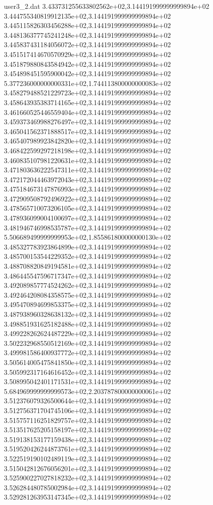 \begin{filecontents}{user3_2.dat}
3.433731255633802562e+02,3.144191999999999894e+02
3.444755340819912135e+02,3.144191999999999894e+02
3.445115826303456288e+02,3.144191999999999894e+02
3.448136377745241248e+02,3.144191999999999894e+02
3.445837431184056072e+02,3.144191999999999894e+02
3.451517414670570929e+02,3.144191999999999894e+02
3.451879880843584942e+02,3.144191999999999894e+02
3.454898451595900042e+02,3.144191999999999894e+02
5.377236000000000331e+02,1.744113800000000083e+02
3.458279488521229723e+02,3.144191999999999894e+02
3.458643935383714165e+02,3.144191999999999894e+02
3.461660525446559404e+02,3.144191999999999894e+02
3.459373469988276497e+02,3.144191999999999894e+02
3.465041562371888517e+02,3.144191999999999894e+02
3.465407989923842820e+02,3.144191999999999894e+02
3.468422599297218198e+02,3.144191999999999894e+02
3.460835107981220631e+02,3.144191999999999894e+02
3.471803636222547311e+02,3.144191999999999894e+02
3.472172044463972043e+02,3.144191999999999894e+02
3.475184673147876993e+02,3.144191999999999894e+02
3.472909508792496922e+02,3.144191999999999894e+02
3.478565710073206105e+02,3.144191999999999894e+02
3.478936099004100697e+02,3.144191999999999894e+02
3.481946746998535787e+02,3.144191999999999894e+02
5.506689499999999953e+02,1.855861800000000130e+02
3.485327783923864899e+02,3.144191999999999894e+02
3.485700153544229352e+02,3.144191999999999894e+02
3.488708820849194581e+02,3.144191999999999894e+02
3.486445547596717347e+02,3.144191999999999894e+02
3.492089857774524262e+02,3.144191999999999894e+02
3.492464208084358575e+02,3.144191999999999894e+02
3.495470894699853375e+02,3.144191999999999894e+02
3.487938960328638132e+02,3.144191999999999894e+02
3.498851931625182488e+02,3.144191999999999894e+02
3.499228262624487229e+02,3.144191999999999894e+02
3.502232968550512169e+02,3.144191999999999894e+02
3.499981586400937772e+02,3.144191999999999894e+02
3.505614005475841850e+02,3.144191999999999894e+02
3.505992317164616452e+02,3.144191999999999894e+02
3.508995042401171531e+02,3.144191999999999894e+02
5.684969999999999573e+02,2.203787800000000061e+02
3.512376079326500644e+02,3.144191999999999894e+02
3.512756371704745106e+02,3.144191999999999894e+02
3.515757116251829757e+02,3.144191999999999894e+02
3.513517625205158197e+02,3.144191999999999894e+02
3.519138153177159438e+02,3.144191999999999894e+02
3.519520426244873761e+02,3.144191999999999894e+02
3.522519190102489119e+02,3.144191999999999894e+02
3.515042812676056201e+02,3.144191999999999894e+02
3.525900227027818232e+02,3.144191999999999894e+02
3.526284480785002984e+02,3.144191999999999894e+02
3.529281263953147345e+02,3.144191999999999894e+02

\end{filecontents}
